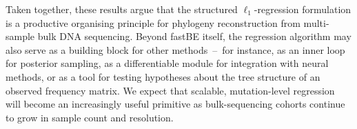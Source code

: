 \documentclass[11pt]{article}
\begin{document}
Taken together, these results argue that the structured $\ell_1$-regression formulation is a productive organising principle for phylogeny reconstruction from multi-sample bulk DNA sequencing. Beyond fastBE itself, the regression algorithm may also serve as a building block for other methods~--~for instance, as an inner loop for posterior sampling, as a differentiable module for integration with neural methods, or as a tool for testing hypotheses about the tree structure of an observed frequency matrix. We expect that scalable, mutation-level regression will become an increasingly useful primitive as bulk-sequencing cohorts continue to grow in sample count and resolution.



\end{document}
